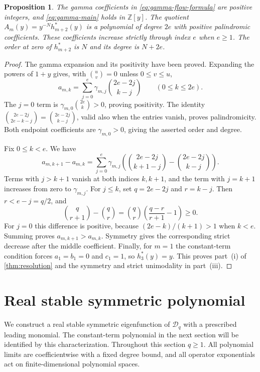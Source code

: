 \documentclass[reqno, 12pt]{article}
\numberwithin{equation}{section}
\newtheorem{proposition}[theorem]{Proposition}
\theoremstyle{definition}
\begin{document}
\begin{proposition}\label{prop:gamma-structure}\label{thm:gamma}
The gamma coefficients in \eqref{eq:gamma-flow-formula} are positive integers, and \eqref{eq:gamma-main} holds in
$\mathbb Z[y]$.  The quotient $A_m(y)=y^{-N}h_{m+2}^*(y)$
is a polynomial of degree $2e$ with positive palindromic
coefficients.  These coefficients increase strictly through
index $e$ when $e\geq1$.  The order at zero of $h_{m+2}^*$ is
$N$ and its degree is $N+2e$.
\end{proposition}
\begin{proof}
The gamma expansion and its positivity have been proved.
Expanding the powers of $1+y$ gives, with
$\binom uv=0$ unless $0\leq v\leq u$,
\begin{equation}\label{eq:ordinary-from-gamma}
a_{m,k}=\sum_{j=0}^e\gamma_{m,j}
\binom{2e-2j}{k-j}\qquad(0\leq k\leq2e).
\end{equation}
The $j=0$ term is $\gamma_{m,0}\binom{2e}k>0$, proving
positivity.  The identity
$\binom{2e-2j}{2e-k-j}=\binom{2e-2j}{k-j}$, valid also
when the entries vanish, proves palindromicity.  Both endpoint
coefficients are $\gamma_{m,0}>0$, giving the asserted order
and degree.

Fix $0\leq k<e$. We have
$$a_{m,k+1}-a_{m,k}= \sum_{j=0}^e\gamma_{m,j} \left(\binom{2e-2j}{k+1-j}-\binom{2e-2j}{k-j}\right).$$
Terms with $j>k+1$ vanish at both indices
$k,k+1$, and the term with $j=k+1$ increases from zero to
$\gamma_{m,j}$.  For $j\leq k$, set $q=2e-2j$ and $r=k-j$.  Then $r<e-j=q/2$, and
\[\binom q{r+1}-\binom qr =\binom qr\left(\frac{q-r}{r+1}-1\right)\geq0.
\]
For $j=0$ this difference is positive, because $(2e-k)/(k+1)>1$ when $k<e$.  Summing proves $a_{m,k+1}>a_{m,k}$.  Symmetry gives the corresponding strict decrease after the middle coefficient.  Finally, for $m=1$ the
constant-term condition forces $a_1=b_1=0$ and $c_1=1$,
so $h_3^*(y)=y$.  This proves part~\textup{(i)} of \cref{thm:resolution} and the symmetry and strict
unimodality in part~\textup{(iii)}.
\end{proof}


\section{Real stable symmetric polynomial}
\label{st:section}

We construct a real stable symmetric eigenfunction of $\mathcal D_q$ with a prescribed leading monomial. 
The constant-term polynomial in the next section will be identified by this characterization.
Throughout this section $q\geq1$.  All polynomial limits are coefficientwise with a fixed degree bound, and all operator
exponentials act on finite-dimensional polynomial spaces.
\end{document}
